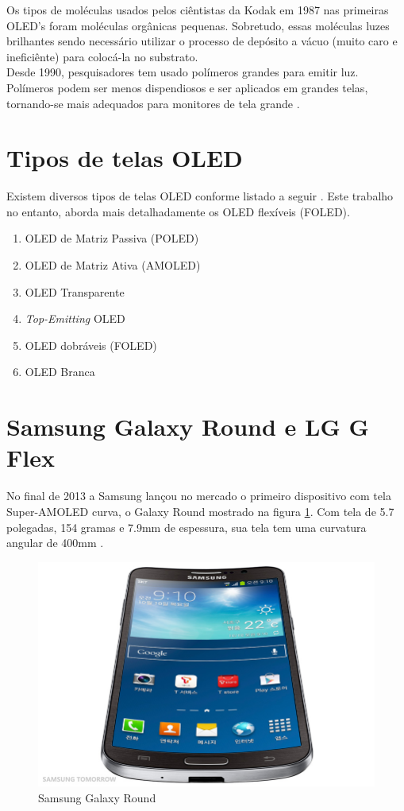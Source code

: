 Os tipos de moléculas usados pelos ciêntistas da Kodak em 1987 nas primeiras OLED's foram moléculas orgânicas pequenas. Sobretudo, essas moléculas luzes brilhantes sendo necessário utilizar o processo de depósito a vácuo (muito caro e ineficiênte) para colocá-la no substrato. \\

Desde 1990, pesquisadores tem usado polímeros grandes para emitir luz. Polímeros podem ser menos dispendiosos e ser aplicados em grandes telas, tornando-se mais adequados para monitores de tela grande \cite{HSWOLED}.\\


\section{Tipos de telas OLED}
\label{sec:tipos}

Existem diversos tipos de telas OLED conforme listado a seguir \cite{HSWOLED}. Este trabalho no entanto, aborda mais detalhadamente os OLED flexíveis (FOLED).

\begin{enumerate}
	\item OLED de Matriz Passiva (POLED)
	\item OLED de Matriz Ativa (AMOLED)
	\item OLED Transparente 
	\item \textit{Top-Emitting} OLED 
	\item OLED dobráveis (FOLED)
	\item OLED Branca 
\end{enumerate}


\section{Samsung Galaxy Round e LG G Flex}
\label{sec:devicesnomercado}

No final de 2013 a Samsung lançou no mercado o primeiro dispositivo com tela Super-AMOLED curva, o Galaxy Round mostrado na figura \ref{fig:galaxy-round}. Com tela de 5.7 polegadas, 154 gramas e 7.9mm de espessura, sua tela tem uma curvatura angular de 400mm \cite{NOLEDDN}.\\

\begin{figure}[!ht]
  \centering
  \includegraphics[width=.60\textwidth]{./figuras/galaxy-round} 
  \caption{Samsung Galaxy Round}
  \label{fig:galaxy-round} 
\end{figure}

